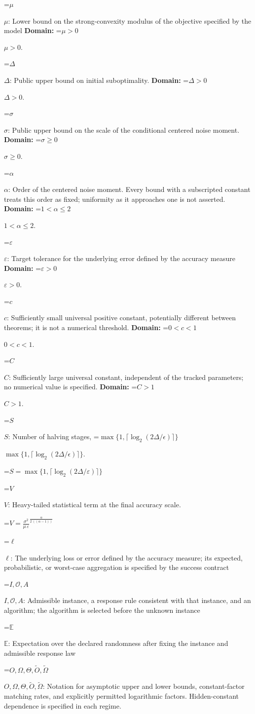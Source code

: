 \documentclass[10pt,a4paper]{article}
\newcommand{\AtlasMath}[1]{\par\begingroup\centering\setbox0=\hbox{$\displaystyle #1$}\ifdim\wd0>1.4\linewidth\typeout{ATLAS WIDE FORMULA: \the\wd0}\fi\ifdim\wd0>\linewidth\resizebox{\linewidth}{!}{\box0}\else\box0\fi\par\endgroup}
\newcommand{\AtlasInlineMath}[1]{\begingroup\setbox0=\hbox{$#1$}\ifdim\wd0>.4\linewidth\endgroup\AtlasMath{#1}\else\endgroup$#1$\fi}
\begin{document}
\AtlasInlineMath{\mu}: Lower bound on the strong-convexity modulus of the objective specified by the model \textbf{Domain:} \AtlasInlineMath{\mu>0}.

\AtlasInlineMath{\Delta}: Public upper bound on initial suboptimality. \textbf{Domain:} \AtlasInlineMath{\Delta>0}.

\AtlasInlineMath{\sigma}: Public upper bound on the scale of the conditional centered noise moment. \textbf{Domain:} \AtlasInlineMath{\sigma\ge0}.

\AtlasInlineMath{\alpha}: Order of the centered noise moment. Every bound with a subscripted constant treats this order as fixed; uniformity as it approaches one is not asserted. \textbf{Domain:} \AtlasInlineMath{1<\alpha\le2}.

\AtlasInlineMath{\varepsilon}: Target tolerance for the underlying error defined by the accuracy measure \textbf{Domain:} \AtlasInlineMath{\varepsilon>0}.

\AtlasInlineMath{c}: Sufficiently small universal positive constant, potentially different between theorems; it is not a numerical threshold. \textbf{Domain:} \AtlasInlineMath{0<c<1}.

\AtlasInlineMath{C}: Sufficiently large universal constant, independent of the tracked parameters; no numerical value is specified. \textbf{Domain:} \AtlasInlineMath{C>1}.

\AtlasInlineMath{S}: Number of halving stages, \AtlasInlineMath{\max\{1,\lceil\log_2(2\Delta/\epsilon)\rceil\}}.


\AtlasMath{S=\max\{1,\lceil\log_2(2\Delta/\varepsilon)\rceil\}}


\AtlasInlineMath{V}: Heavy-tailed statistical term at the final accuracy scale.


\AtlasMath{V={\frac{{\sigma}^{2}}{\mu\,\varepsilon}}^{\frac{\alpha}{2\,((\alpha-1))}}}


\AtlasInlineMath{\ell}: The underlying loss or error defined by the accuracy measure; its expected, probabilistic, or worst-case aggregation is specified by the success contract

\AtlasInlineMath{I,\mathcal{O},A}: Admissible instance, a response rule consistent with that instance, and an algorithm; the algorithm is selected before the unknown instance

\AtlasInlineMath{\mathbb{E}}: Expectation over the declared randomness after fixing the instance and admissible response law

\AtlasInlineMath{O,\Omega,\Theta,\widetilde{O},\widetilde\Omega}: Notation for asymptotic upper and lower bounds, constant-factor matching rates, and explicitly permitted logarithmic factors. Hidden-constant dependence is specified in each regime.
\end{document}
